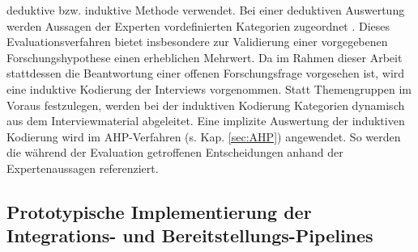 deduktive bzw. induktive Methode verwendet. Bei einer deduktiven Auswertung werden Aussagen der Experten vordefinierten Kategorien zugeordnet \cite[244 ff.]{Hildebrandt.2015}. Dieses Evaluationsverfahren bietet insbesondere zur Validierung einer vorgegebenen Forschungshypothese einen erheblichen Mehrwert. Da im Rahmen dieser Arbeit stattdessen die Beantwortung einer offenen Forschungsfrage vorgesehen ist, wird eine induktive Kodierung der Interviews vorgenommen. Statt Themengruppen im Voraus festzulegen, werden bei der induktiven Kodierung Kategorien dynamisch aus dem Interviewmaterial abgeleitet. Eine implizite Auswertung der induktiven Kodierung wird im AHP-Verfahren (s. Kap. \ref*{sec:AHP}) angewendet. So werden die während der Evaluation getroffenen Entscheidungen anhand der Expertenaussagen referenziert.



\subsection{Prototypische Implementierung der Integrations- und Bereitstellungs-Pipelines}

